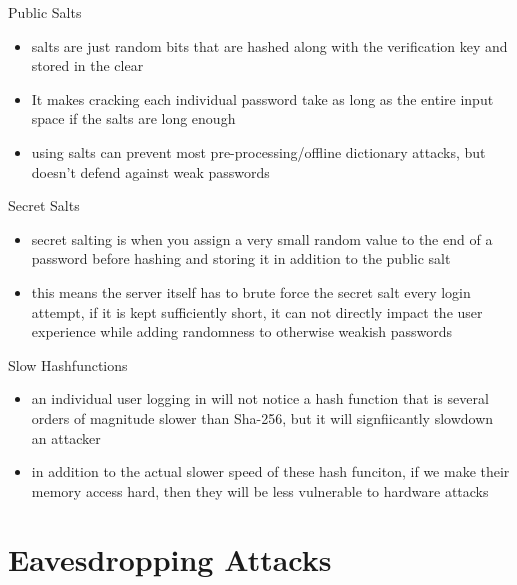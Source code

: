\documentclass[handout]{beamer}
\begin{document}
\begin{frame}{Public Salts}
  \begin{itemize}
    \item \pause salts are just random bits that are hashed along with the verification key and stored in the clear
    \item \pause It makes cracking each individual password take as long as the entire input space if the salts are long enough
    \item \pause using salts can prevent most pre-processing/offline dictionary attacks, but doesn't defend against weak passwords
  \end{itemize} 
\end{frame}

\begin{frame}{Secret Salts}
  \begin{itemize}
    \item \pause secret salting is when you assign a very small random value to the end of a password before hashing and storing it in addition to the public salt 
    \item \pause this means the server itself has to brute force the secret salt every login attempt, if it is kept sufficiently short, it can not directly impact the user experience while adding randomness to otherwise weakish passwords
  \end{itemize} 
\end{frame}

\begin{frame}{Slow Hashfunctions}
  \begin{itemize}
    \item \pause an individual user logging in will not notice a hash function that is several orders of magnitude slower than Sha-256, but it will signfiicantly slowdown an attacker
    \item \pause in addition to the actual slower speed of these hash funciton, if we make their memory access hard, then they will be less vulnerable to hardware attacks
  \end{itemize}
\end{frame}

\section{Eavesdropping Attacks}
\end{document}
